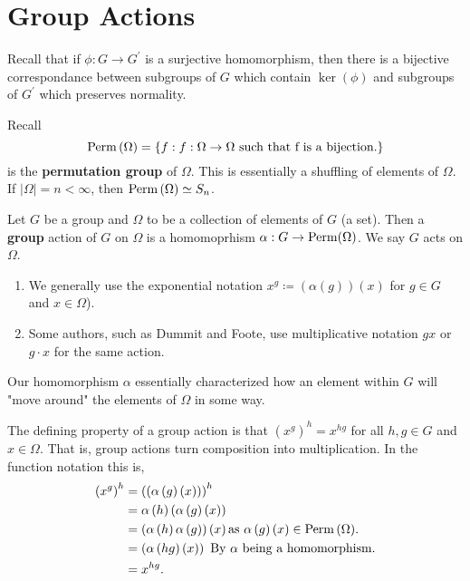 \section{Group Actions}
\begin{recall}
	Recall that if \(\phi: G \to G^{\prime}\) is a surjective homomorphism, then there is a bijective correspondance between subgroups of \(G\) which contain \(\ker \left( \phi \right) \) and subgroups of \(G^{\prime}\) which preserves normality.
\end{recall}
\begin{definition}
	Recall \[\operatorname{Perm} \left( \Omega \right) = \{f :  f: \Omega \to \Omega \text{ such that f is a bijection.} \} \] is the \textbf{permutation group} of \(\Omega\). This is essentially a shuffling of elements of \(\Omega\). If \(\left| \Omega \right| = n < \infty\), then \(\operatorname{Perm}\left( \Omega \right) \simeq S_{n}\).
\end{definition}
\begin{definition}
	Let \(G\) be a group and \(\Omega\) to be a collection of elements of \(G\) (a set). Then a \textbf{group} action of \(G\) on \(\Omega\) is a homomoprhism \(\alpha: G \to \operatorname{Perm}(\Omega)\). We say \(G\) acts on \(\Omega\).
\end{definition}
\begin{notation}
\begin{enumerate}
	\item We generally use the exponential notation \(x^{g}\coloneqq \left( \alpha \left( g \right)  \right) \left( x \right) \) for \(g \in G\) and \( x \in \Omega\)).
	\item Some authors, such as Dummit and Foote, use multiplicative notation \(gx\) or \(g \cdot x\) for the same action.
\end{enumerate}\end{notation}
\begin{intuition}
Our homomorphism \(\alpha\) essentially characterized how an element within \(G\) will "move around" the elements of \(\Omega\) in some way.
\end{intuition}
The defining property of a group action is that \(\left( x^{g} \right)^{h}=x^{hg} \) for all \(h, g \in G\) and \(x \in \Omega\). That is, group actions turn composition into multiplication. In the function notation this is,
\begin{align*}
	\left( x^{g} \right) ^{h} &= \left( \left( \alpha\left( g \right) \left( x \right)  \right)  \right) ^{h}\\
				  &= \alpha \left( h \right) \left( \alpha\left( g \right) \left( x \right)  \right) \\
				  &= \left( \alpha\left( h \right) \alpha\left( g \right)  \right) \left( x \right) \text{as \(\alpha \left( g \right) \left( x \right) \in \operatorname{Perm}\left( \Omega \right) \).} \\
				  &= \left( \alpha\left( hg \right) \left( x \right)  \right) \text{ By \(\alpha\) being a homomorphism.}\\
				  &= x^{hg}
.\end{align*}

